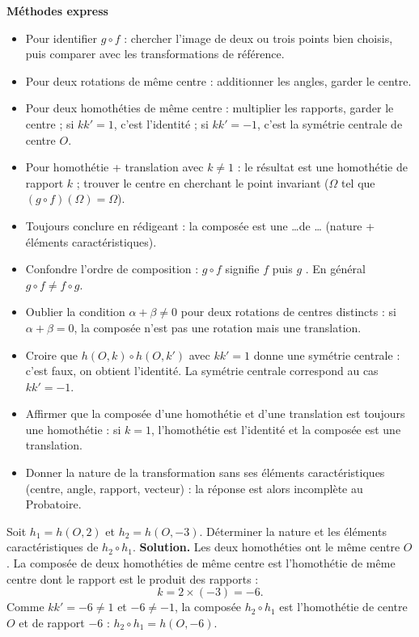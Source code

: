 \documentclass[11pt]{article}
\newcommand{\cle}[1]{{\popxbold\color{popdark}#1}}
\begin{document}
\begin{aretenir}[L'essentiel de la le\c{c}on]
\textbf{M\'ethodes express}
\begin{itemize}
\item Pour identifier $g\circ f$ : chercher l'image de deux ou trois points bien choisis, puis comparer avec les transformations de r\'ef\'erence.
\item Pour deux rotations de m\^eme centre : additionner les angles, garder le centre.
\item Pour deux homoth\'eties de m\^eme centre : multiplier les rapports, garder le centre ; si $kk'=1$, c'est l'identit\'e ; si $kk'=-1$, c'est la sym\'etrie centrale de centre $O$.
\item Pour homoth\'etie + translation avec $k\neq 1$ : le r\'esultat est une homoth\'etie de rapport $k$ ; trouver le centre en cherchant le point invariant ($\Omega$ tel que $(g\circ f)(\Omega)=\Omega$).
\item Toujours conclure en r\'edigeant : \og la compos\'ee est une \ldots de \ldots \fg{} (nature + \'el\'ements caract\'eristiques).
\end{itemize}
\end{aretenir}

\begin{attention}
\begin{itemize}
\item Confondre l'ordre de composition : $g\circ f$ signifie \og $f$ puis $g$ \fg. En g\'en\'eral $g\circ f \neq f\circ g$.
\item Oublier la condition $\alpha+\beta \neq 0$ pour deux rotations de centres distincts : si $\alpha+\beta=0$, la compos\'ee n'est pas une rotation mais une translation.
\item Croire que $h(O,k)\circ h(O,k')$ avec $kk'=1$ donne une sym\'etrie centrale : c'est faux, on obtient l'\cle{identit\'e}. La sym\'etrie centrale correspond au cas $kk'=-1$.
\item Affirmer que la compos\'ee d'une homoth\'etie et d'une translation est toujours une homoth\'etie : si $k=1$, l'homoth\'etie est l'identit\'e et la compos\'ee est une translation.
\item Donner la nature de la transformation sans ses \'el\'ements caract\'eristiques (centre, angle, rapport, vecteur) : la r\'eponse est alors incompl\`ete au Probatoire.
\end{itemize}
\end{attention}

\begin{exoresolu}
Soit $h_1=h(O,2)$ et $h_2=h(O,-3)$. D\'eterminer la nature et les \'el\'ements caract\'eristiques de $h_2\circ h_1$.
\tcblower
\textbf{Solution.} Les deux homoth\'eties ont le m\^eme centre $O$. La compos\'ee de deux homoth\'eties de m\^eme centre est l'homoth\'etie de m\^eme centre dont le rapport est le produit des rapports :
\[ k = 2\times(-3) = -6. \]
Comme $kk'=-6\neq 1$ et $-6\neq -1$, la compos\'ee $h_2\circ h_1$ est l'\cle{homoth\'etie} de centre $O$ et de rapport $-6$ : $h_2\circ h_1 = h(O,-6)$.
\end{exoresolu}
\end{document}
